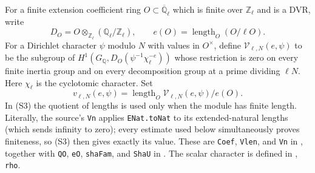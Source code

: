 \documentclass[11pt,a4paper]{article}
\theoremstyle{definition}
\begin{document}
For a finite extension coefficient ring $O\subset\overline{\mathbb Q}_\ell$
which is finite over $\mathbb Z_\ell$ and is a DVR, write
\[
 D_O=O\otimes_{\mathbb Z_\ell}(\mathbb Q_\ell/\mathbb Z_\ell),
 \qquad e(O)=\operatorname{length}_O(O/\ell O).
 \tag{S2}
\]
For a Dirichlet character $\psi$ modulo $N$ with values in $O^\times$, define
$\mathcal V_{\ell,N}(e,\psi)$ to be the subgroup of
$H^1(G_{\mathbb Q},D_O(\psi^{-1}\chi_\ell^{-e}))$
whose restriction is zero on every finite inertia group and on every
decomposition group at a prime dividing $\ell N$. Here $\chi_\ell$ is the
cyclotomic character. Set
\[
 v_{\ell,N}(e,\psi)
 =\operatorname{length}_O\mathcal V_{\ell,N}(e,\psi)/e(O).
 \tag{S3}
\]
In (S3) the quotient of lengths is used only when the module has finite
length. Literally, the source's \texttt{Vn} applies
\texttt{ENat.toNat} to its extended-natural lengths (which sends
infinity to zero); every estimate used below simultaneously proves
finiteness, so (S3) then gives exactly its value. These are
\texttt{Coef}, \texttt{Vlen}, and \texttt{Vn} in
, together
with \texttt{QO}, \texttt{eO}, \texttt{shaFam}, and \texttt{ShaU} in
.
The scalar character is defined in
, \texttt{rho}.
\end{document}

